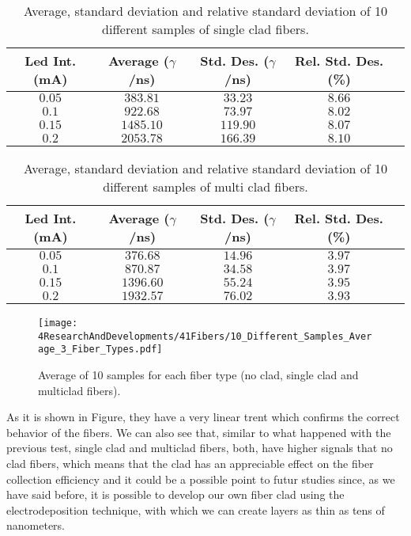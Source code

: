 \begin{table}[htbp]
\begin{center}
\begin{tabular}{|c|c|c|c|c|}
\hline
Led Int. (mA) & Average ($\gamma$/ns) & Std. Des. ($\gamma$/ns) & Rel. Std. Des. (\%)\\
\hline \hline \hline
$0.05$ & $383.81$ & $33.23$ & $8.66$ \\ \hline
$0.1$ & $922.68$ & $73.97$ & $8.02$ \\ \hline
$0.15$ & $1485.10$ & $119.90$ & $8.07$ \\ \hline
$0.2$ & $2053.78$ & $166.39$ & $8.10$ \\ \hline
\end{tabular}
\caption{Average, standard deviation and relative standard deviation of 10 different samples of single clad fibers.}
\label{tab:10DifferentSamplesSingleClad}
\end{center}
\end{table}

\begin{table}[htbp]
\begin{center}
\begin{tabular}{|c|c|c|c|c|}
\hline
Led Int. (mA) & Average ($\gamma$/ns) & Std. Des. ($\gamma$/ns) & Rel. Std. Des. (\%)\\
\hline \hline \hline
$0.05$ & $376.68$ & $14.96$ & $3.97$ \\ \hline
$0.1$ & $870.87$ & $34.58$ & $3.97$ \\ \hline
$0.15$ & $1396.60$ & $55.24$ & $3.95$ \\ \hline
$0.2$ & $1932.57$ & $76.02$ & $3.93$ \\ \hline
\end{tabular}
\caption{Average, standard deviation and relative standard deviation of 10 different samples of multi clad fibers.}
\label{tab:10DifferentSamplesMultiClad}
\end{center}
\end{table}

\begin{figure}[h]
\centering
\texttt{[image: 4ResearchAndDevelopments/41Fibers/10\_Different\_Samples\_Average\_3\_Fiber\_Types.pdf]}
\caption{Average of 10 samples for each fiber type (no clad, single clad and multiclad fibers).\label{fig:AveregeThreeFiberTypes}}
\end{figure}

As it is shown in Figure, they have a very linear trent which confirms the correct behavior of the fibers. We can also see that, similar to what happened with the previous test, single clad and multiclad fibers, both, have higher signals that no clad fibers, which means that the clad has an appreciable effect on the fiber collection efficiency and it could be a possible point to futur studies since, as we have said before, it is possible to develop our own fiber clad using the electrodeposition technique, with which we can create layers as thin as tens of nanometers.

